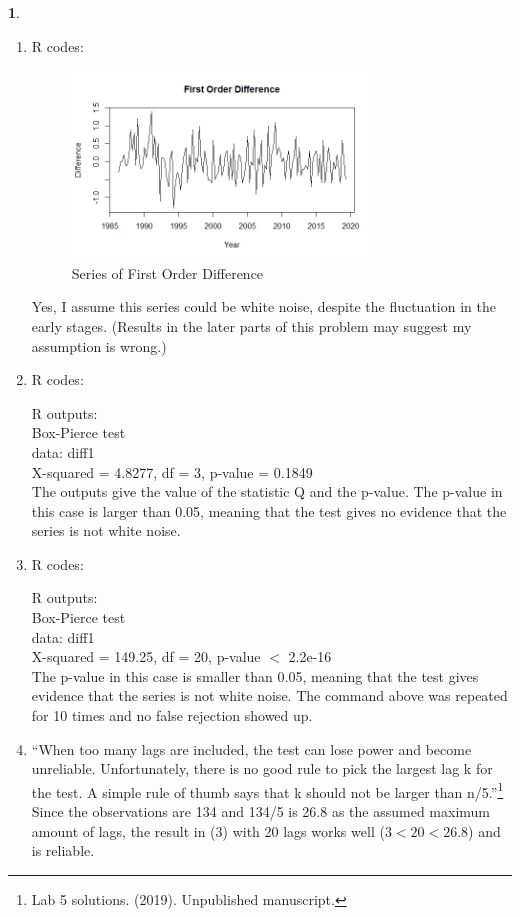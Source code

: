 \documentclass[10pt]{article}
\newtheorem{prob}{\bm{$Problem$}}
\begin{document}
\begin{prob}
\end{prob}
\begin{enumerate}[1)]
\vspace{3mm}

\item
R codes:

\begin{figure}[H]
  \centering
  \includegraphics[width=8cm,height=5cm]{p41a.jpeg}
  \caption{Series of First Order Difference}
\end{figure}
Yes, I assume this series could be white noise, despite the fluctuation in the early stages. (Results in the later parts of this problem may suggest my assumption is wrong.) %
\vspace{3mm}

\item
R codes:

R outputs:\\
Box-Pierce test\\
data: diff1\\
X-squared = 4.8277, df = 3, p-value = 0.1849\\
The outputs give the value of the statistic Q and the p-value. The p-value in this case is larger than 0.05, meaning that the test gives no evidence that the series is not white noise.
\vspace{3mm}

\item
R codes:

R outputs:\\
Box-Pierce test\\
data: diff1\\
X-squared = 149.25, df = 20, p-value $<$ 2.2e-16\\
The p-value in this case is smaller than 0.05, meaning that the test gives evidence that the series is not white noise. The command above was repeated for 10 times and no false rejection showed up.
\vspace{3mm}

\item
``When too many lags are included, the test can lose power and become unreliable. Unfortunately, there is no good rule to pick the largest lag k for the test. A simple rule of thumb says that k should not be larger than n/5.''\footnote{ Lab 5 solutions. (2019). Unpublished manuscript.} Since the observations are 134 and 134/5 is 26.8 as the assumed maximum amount of lags, the result in (3) with 20 lags works well ($3<20<26.8$) and is reliable.

\end{enumerate}
\vspace{3mm}
\end{document}
